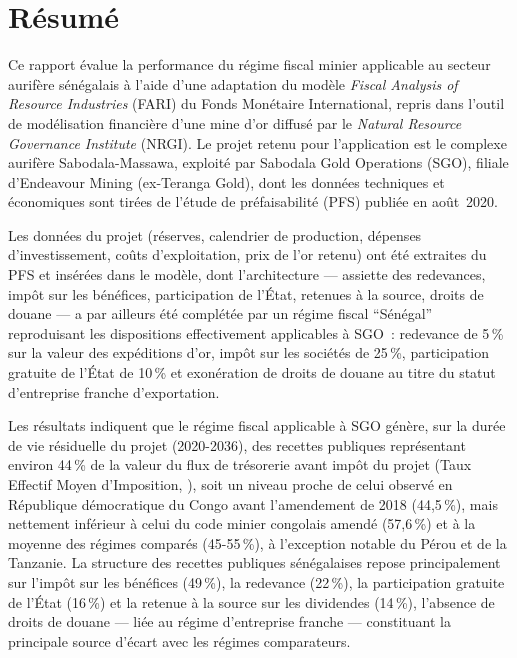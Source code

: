 \chapter*{Résumé}

Ce rapport évalue la performance du régime fiscal minier applicable au secteur aurifère sénégalais à l'aide d'une adaptation du modèle \emph{Fiscal Analysis of Resource Industries} (FARI) du Fonds Monétaire International, repris dans l'outil de modélisation financière d'une mine d'or diffusé par le \emph{Natural Resource Governance Institute} (NRGI). Le projet retenu pour l'application est le complexe aurifère Sabodala-Massawa, exploité par Sabodala Gold Operations (SGO), filiale d'Endeavour Mining (ex-Teranga Gold), dont les données techniques et économiques sont tirées de l'étude de préfaisabilité (PFS) publiée en août~2020.

Les données du projet (réserves, calendrier de production, dépenses d'investissement, coûts d'exploitation, prix de l'or retenu) ont été extraites du PFS et insérées dans le modèle, dont l'architecture --- assiette des redevances, impôt sur les bénéfices, participation de l'État, retenues à la source, droits de douane --- a par ailleurs été complétée par un régime fiscal ``Sénégal'' reproduisant les dispositions effectivement applicables à SGO~: redevance de 5\,\% sur la valeur des expéditions d'or, impôt sur les sociétés de 25\,\%, participation gratuite de l'État de 10\,\% et exonération de droits de douane au titre du statut d'entreprise franche d'exportation.

Les résultats indiquent que le régime fiscal applicable à SGO génère, sur la durée de vie résiduelle du projet (2020-2036), des recettes publiques représentant environ 44\,\% de la valeur du flux de trésorerie avant impôt du projet (Taux Effectif Moyen d'Imposition, \TEMI), soit un niveau proche de celui observé en République démocratique du Congo avant l'amendement de 2018 (44,5\,\%), mais nettement inférieur à celui du code minier congolais amendé (57,6\,\%) et à la moyenne des régimes comparés (45-55\,\%), à l'exception notable du Pérou et de la Tanzanie. La structure des recettes publiques sénégalaises repose principalement sur l'impôt sur les bénéfices (49\,\%), la redevance (22\,\%), la participation gratuite de l'État (16\,\%) et la retenue à la source sur les dividendes (14\,\%), l'absence de droits de douane --- liée au régime d'entreprise franche --- constituant la principale source d'écart avec les régimes comparateurs.

